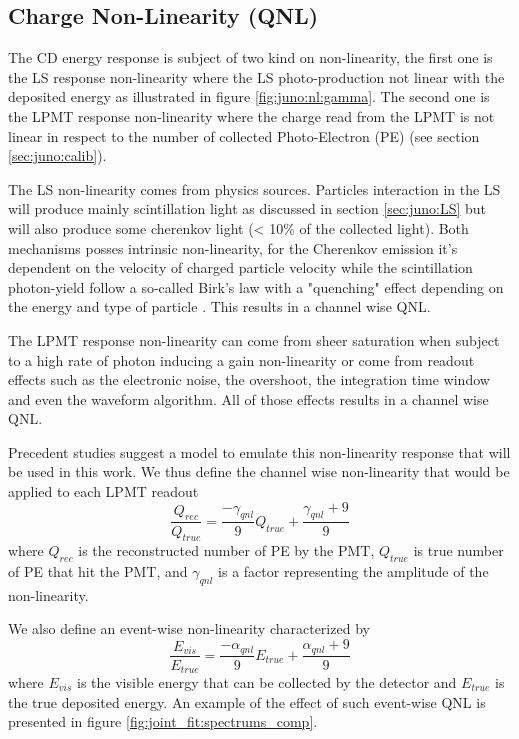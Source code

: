 \documentclass[../main.tex]{subfiles}
\begin{document}
\subsection{Charge Non-Linearity (QNL)}

The CD energy response is subject of two kind on non-linearity, the first one is the LS response non-linearity where the LS photo-production not linear with the deposited energy as illustrated in figure \ref{fig:juno:nl:gamma}. The second one is the LPMT response non-linearity where the charge read from the LPMT is not linear in respect to the number of collected Photo-Electron (PE) (see section \ref{sec:juno:calib}).

The LS non-linearity comes from physics sources. Particles interaction in the LS will produce mainly scintillation light as discussed in section \ref{sec:juno:LS} but will also produce some cherenkov light (< 10\% of the collected light). Both mechanisms posses intrinsic non-linearity, for the Cherenkov emission it's dependent on the velocity of charged particle velocity while the scintillation photon-yield follow a so-called Birk's law with a "quenching" effect depending on the energy and type of particle \cite{particle_data_group_review_2020}. This results in a channel wise QNL.

The LPMT response non-linearity can come from sheer saturation when subject to a high rate of photon inducing a gain non-linearity or come from readout effects such as the electronic noise, the overshoot, the integration time window and even the waveform algorithm. All of those effects results in a channel wise QNL.

Precedent studies \cite{han_dual_2021} suggest a model to emulate this non-linearity response that will be used in this work. We thus define the channel wise non-linearity that would be applied to each LPMT readout
\begin{equation}
  \label{eq:joint_fit:gamma_yang}
  \frac{Q_{rec}}{Q_{true}} = \frac{-\gamma_{qnl}}{9} Q_{true} + \frac{\gamma_{qnl} + 9}{9}
\end{equation}
where $Q_{rec}$ is the reconstructed number of PE by the PMT, $Q_{true}$ is true number of PE that hit the PMT, and $\gamma_{qnl}$ is a factor representing the amplitude of the non-linearity.

We also define an event-wise non-linearity characterized by
\begin{equation}
  \label{eq:joint_fit:alpha_yang}
  \frac{E_{vis}}{E_{true}} = \frac{-\alpha_{qnl}}{9} E_{true} + \frac{\alpha_{qnl} + 9}{9}
\end{equation}
where $E_{vis}$ is the visible energy that can be collected by the detector and $E_{true}$ is the true deposited energy. An example of the effect of such event-wise QNL is presented in figure \ref{fig:joint_fit:spectrums_comp}.
\end{document}
